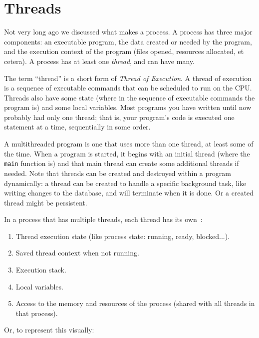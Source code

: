




\section*{Threads}

Not very long ago we discussed what makes a process. A process has three major components: an executable program, the data created or needed by the program, and the execution context of the program (files opened, resources allocated, et cetera). A process has at least one \textit{thread}, and can have many.

The term ``thread'' is a short form of \textit{Thread of Execution}. A thread of execution is a sequence of executable commands that can be scheduled to run on the CPU. Threads also have some state (where in the sequence of executable commands the program is) and some local variables. Most programs you have written until now probably had only one thread; that is, your program's code is executed one statement at a time, sequentially in some order. 

A multithreaded program is one that uses more than one thread, at least some of the time. When a program is started, it begins with an initial thread (where the \texttt{main} function is) and that main thread can create some additional threads if needed. Note that threads can be created and destroyed within a program dynamically: a thread can be created to handle a specific background task, like writing changes to the database, and will terminate when it is done. Or a created thread might be persistent.

In a process that has multiple threads, each thread has its own~\cite{osi}:
\begin{enumerate}
	\item Thread execution state (like process state: running, ready, blocked...).
	\item Saved thread context when not running.
	\item Execution stack.
	\item Local variables.
	\item Access to the memory and resources of the process (shared with all threads in that process).
\end{enumerate}

Or, to represent this visually:

